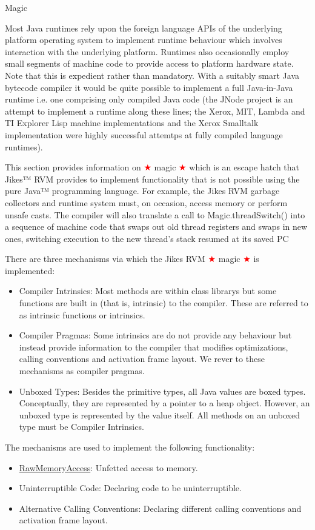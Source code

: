 \begin{section}{Magic}

Most Java runtimes rely upon the foreign language APIs of the underlying platform operating system to implement runtime behaviour which involves interaction with the underlying platform. Runtimes also occasionally employ small segments of machine code to provide access to platform hardware state. Note that this is expedient rather than mandatory. With a suitably smart Java bytecode compiler it would be quite possible to implement a full Java-in-Java runtime i.e. one comprising only compiled Java code (the JNode project is an attempt to implement a runtime along these lines; the Xerox, MIT, Lambda and TI Explorer Lisp machine implementations and the Xerox Smalltalk implementation were highly successful attemtps at fully compiled language runtimes).

This section provides information on \textcolor{red}{$\bigstar$} magic \textcolor{red}{$\bigstar$} which is an escape hatch that Jikes™ RVM provides to implement functionality that is not possible using the pure Java™ programming language. For example, the Jikes RVM garbage collectors and runtime system must, on occasion, access memory or perform unsafe casts. The compiler will also translate a call to Magic.threadSwitch() into a sequence of machine code that swaps out old thread registers and swaps in new ones, switching execution to the new thread's stack resumed at its saved PC

There are three mechanisms via which the Jikes RVM \textcolor{red}{$\bigstar$} magic \textcolor{red}{$\bigstar$} is implemented:
\begin{itemize}
  \item Compiler Intrinsics: Most methods are within class librarys but some functions are built in (that is, intrinsic) to the compiler. These are referred to as intrinsic functions or intrinsics.
  \item Compiler Pragmas: Some intrinsics are do not provide any behaviour but instead provide information to the compiler that modifies optimizations, calling conventions and activation frame layout. We rever to these mechanisms as compiler pragmas.
  \item Unboxed Types: Besides the primitive types, all Java values are boxed types. Conceptually, they are represented by a pointer to a heap object. However, an unboxed type is represented by the value itself. All methods on an unboxed type must be Compiler Intrinsics.
\end{itemize}

The mechanisms are used to implement the following functionality:
\begin{itemize}
  \item \hyperref[sec:rawmemoryaccess]{RawMemoryAccess}: Unfetted access to memory.
  \item Uninterruptible Code: Declaring code to be uninterruptible.
  \item Alternative Calling Conventions: Declaring different calling conventions and activation frame layout.
\end{itemize}

\end{section}